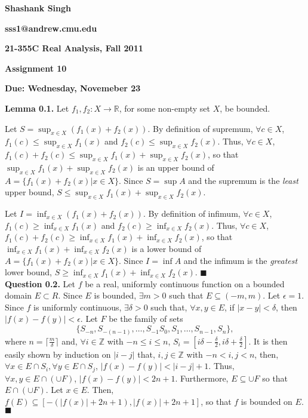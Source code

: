 \documentclass{article}
\begin{document}
\begin{center}
\textbf{Shashank Singh}

\textbf{sss1@andrew.cmu.edu}

\textbf{21-355C \quad Real Analysis, Fall 2011}

\textbf{Assignment 10}

\textbf{Due: Wednesday, Novemeber 23}
\end{center}

\textbf{Lemma 0.1.} Let $f_1, f_2 : X \rightarrow \mathbb{R}$, for some
non-empty set $X$, be bounded.

Let $S = \sup_{x \in X} \left(f_1(x) + f_2(x)\right)$.
By definition of supremum, $\forall c \in X$, $f_1(c) \leq \sup_{x \in X}
f_1(x)$ and $f_2(c) \leq \sup_{x \in X} f_2(x)$. Thus, $\forall c \in X$,
$f_1(c) + f_2(c) \leq \sup_{x \in X} f_1(x) + \sup_{x \in X} f_2(x)$, so that
$\sup_{x \in X} f_1(x) + \sup_{x \in X} f_2(x)$ is an upper bound of
$A = \{f_1(x) + f_2(x) | x \in X\}$. Since $S = \sup A$ and the supremum is
the \emph{least} upper bound, $S \leq \sup_{x \in X} f_1(x) +
\sup_{x \in X} f_2(x)$.

Let $I = \inf_{x \in X} \left(f_1(x) + f_2(x)\right)$.
By definition of infimum, $\forall c \in X$, $f_1(c) \geq \inf_{x \in X}
f_1(x)$ and $f_2(c) \geq \inf_{x \in X} f_2(x)$. Thus, $\forall c \in X$,
$f_1(c) + f_2(c) \geq \inf_{x \in X} f_1(x) + \inf_{x \in X} f_2(x)$, so that
$\inf_{x \in X} f_1(x) + \inf_{x \in X} f_2(x)$ is a lower bound of
$A = \{f_1(x) + f_2(x) | x \in X\}$. Since $I = \inf A$ and the infimum is
the \emph{greatest} lower bound, $S \geq \inf_{x \in X} f_1(x) +
\inf_{x \in X} f_2(x)$. \qquad $\blacksquare$ \\

\textbf{Question 0.2.} Let $f$ be a real, uniformly continuous function on a
bounded domain $E \subset R$. Since $E$ is bounded, $\exists m > 0$ such that
$E \subseteq (-m, m)$. Let $\epsilon = 1$. Since $f$ is uniformly continuous,
$\exists \delta > 0$ such that, $\forall x, y \in E$, if $|x - y| < \delta$,
then $|f(x) - f(y)| < \epsilon$. Let $F$ be the family of sets
\[\{S_{-n}, S_{-(n - 1)}, \ldots, S_{-1} S_0, S_1, \ldots, S_{n - 1}, S_n\},\]
where $n = \lceil \frac{m}{\delta} \rceil$ and, $\forall i \in \mathbb{Z}$
with $-n \leq i \leq n$, $S_i = [i\delta - \frac{\delta}{2},
i\delta + \frac{\delta}{2}]$. It is then easily shown by induction on
$|i - j|$ that, $i, j \in \mathbb{Z}$ with $-n < i, j < n$, then,
$\forall x \in E \cap S_i, \forall y \in E \cap S_j$, $|f(x) - f(y)|
 < |i - j| + 1$. Thus, $\forall x, y \in E \cap \left( \cup F \right)$,
$|f(x) - f(y)| < 2n + 1$. Furthermore, $E \subseteq \cup F$ so that
$E \cap \left( \cup  F \right)$. Let $x \in E$. Then,
$f(E) \subseteq [-(|f(x)| + 2n + 1), |f(x)| + 2n + 1]$, so that $f$ is bounded
on $E$. \qquad $\blacksquare$
\end{document}
